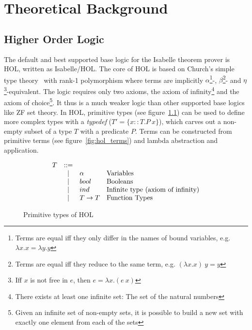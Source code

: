 \chapter{Theoretical Background}

\section{Higher Order Logic}

The default and best supported base logic for the Isabelle theorem prover is \ac{HOL}, written as Isabelle/HOL. The core of \ac{HOL} is based on Church's simple type theory~\cite{simple_type_theory} with rank-1 polymorphism where terms are implicitly $\alpha$\footnote{Terms are equal iff they only differ in the names of bound variables, e.g. $\lambda x.x = \lambda y.y$}-, $\beta$\footnote{Terms are equal iff they reduce to the same term, e.g. $(\lambda x.x) \: y = y$}- and $\eta$\footnote{Iff $x$ is not free in $e$, then $e = \lambda x. (e \: x)$}-equivalent. The logic requires only two axioms, the axiom of infinity\footnote{There exists at least one infinite set: The set of the natural numbers} and the axiom of choice\footnote{Given an infinite set of non-empty sets, it is possible to build a new set with exactly one element from each of the sets}. It thus is a much weaker logic than other supported base logics like \ac{ZF} set theory. In \ac{HOL}, primitive types (see figure~\ref{fig:hol_types}) can be used to define more complex types with a \textit{typedef} ($T' = \{ x :: T. P \: x \}$), which carves out a non-empty subset of a type $T$ with a predicate $P$. Terms can be constructed from primitive terms (see figure~\ref{fig:hol_terms}) and lambda abstraction and application.

\begin{figure} %
\[
\begin{array}{rcll}
T  & \bnfeq &  & \\ %
& \bnfor & \alpha & \text{Variables} \\
& \bnfor & bool & \text{Booleans} \\
& \bnfor & ind & \text{Infinite type (axiom of infinity)} \\
& \bnfor & T \to T & \text{Function Types} \\
\end{array}
\]
\caption{Primitive types of \ac{HOL}}
\label{fig:hol_types}
\end{figure}

